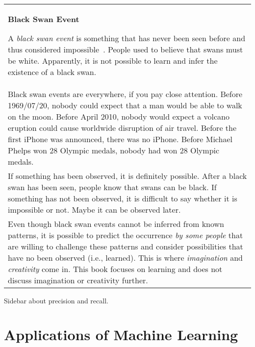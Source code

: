 \vspace{0.1in}\begin{tabular}{p{5in}}
\index{black swan event}
  \begin{center}
    {\bf Black Swan Event}
  \end{center}
  A {\it black swan event} is something that has never been seen
  before and thus considered
  impossible~\cite{Taleb2010BlackSwan}.  People
  used to believe that swans must be white. Apparently, it is not
  possible to learn and infer the existence of a black swan.

  \\
  
  Black swan events are everywhere, if you pay close attention.
  Before 1969/07/20, nobody could expect that a man would be able to
  walk on the moon. Before April 2010, nobody would expect a volcano
  eruption could cause worldwide disruption of air travel.  Before the
  first iPhone was announced, there was no iPhone. Before Michael
  Phelps won 28 Olympic medals, nobody had won 28 Olympic medals.

  \\

  If something has been observed, it is definitely possible.  After a
  black swan has been seen, people know that swans can be black.  If
  something has not been observed, it is difficult to say whether it
  is impossible or not. Maybe it can be observed later.

  \\

  Even though black swan events cannot be inferred  from known patterns,
  it is possible to predict the occurrence {\it by some people} that
  are willing to challenge these patterns and consider
  possibilities that have no been observed (i.e., learned). This
  is where {\it imagination} and {\it creativity} come in.
  This book focuses on learning  and does not discuss imagination or
  creativity further.

  \index{imagination}
  \index{creativity}
    
  
\end{tabular}\vspace{0.1in}


Sidebar about precision and recall.


\section{Applications of Machine Learning}

